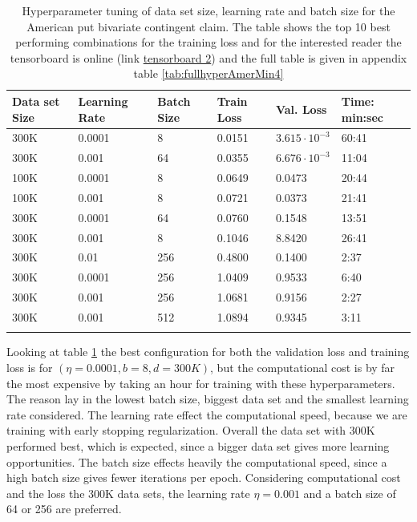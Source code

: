 \begin{table}[th]
\caption{Hyperparameter tuning of data set size, learning rate and batch size for the American put bivariate contingent claim. The table shows the top 10 best performing combinations for the training loss and for the interested reader the tensorboard is online (link \href{https://tensorboard.dev/experiment/mQWtOskJRoWrmrFgOIVQ4g/}{tensorboard 2}) and the full table is given in appendix table \ref{tab:fullhyperAmerMin4}}
\label{tab:hyperAmerMin1}
\centering
\begin{tabular}{llllll}
\toprule
\textbf{Data set Size} & \textbf{Learning Rate} & \textbf{Batch Size} & \textbf{Train Loss} & \textbf{Val. Loss} & \textbf{Time: min:sec} \\
\midrule
300K    & 0.0001 & 8     & 0.0151 & $3.615\cdot 10^{-3}$ & 60:41\\ 
300K    & 0.001  & 64    & 0.0355 & $6.676\cdot 10^{-3}$ & 11:04\\ 
100K    & 0.0001 & 8     & 0.0649 & 0.0473 & 20:44\\ 
100K    & 0.001  & 8     & 0.0721 & 0.0373 & 21:41\\ 
300K    & 0.0001 & 64    & 0.0760 & 0.1548 & 13:51\\ 
300K    & 0.001  & 8     & 0.1046 & 8.8420 & 26:41\\ 
300K    & 0.01   & 256   & 0.4800 & 0.1400 & 2:37\\ 
300K    & 0.0001 & 256   & 1.0409 & 0.9533 & 6:40\\ 
300K    & 0.001  & 256   & 1.0681 & 0.9156 & 2:27 \\ 
300K    & 0.001  & 512   & 1.0894 & 0.9345 & 3:11 \\ 
\bottomrule\\
\end{tabular}
\end{table}

Looking at table \ref{tab:hyperAmerMin1} the best configuration for both the validation loss and training loss is for $(\eta=0.0001, b=8, d=300K)$, but the computational cost is by far the most expensive by taking an hour for training with these hyperparameters. The reason lay in the lowest batch size, biggest data set and the smallest learning rate considered. The learning rate effect the computational speed, because we are training with early stopping regularization. Overall the data set with 300K performed best, which is expected, since a bigger data set gives more learning opportunities. The batch size effects heavily the computational speed, since a high batch size gives fewer iterations per epoch. Considering computational cost and the loss the 300K data sets, the learning rate $\eta=0.001$ and a batch size of 64 or 256 are preferred.\\

